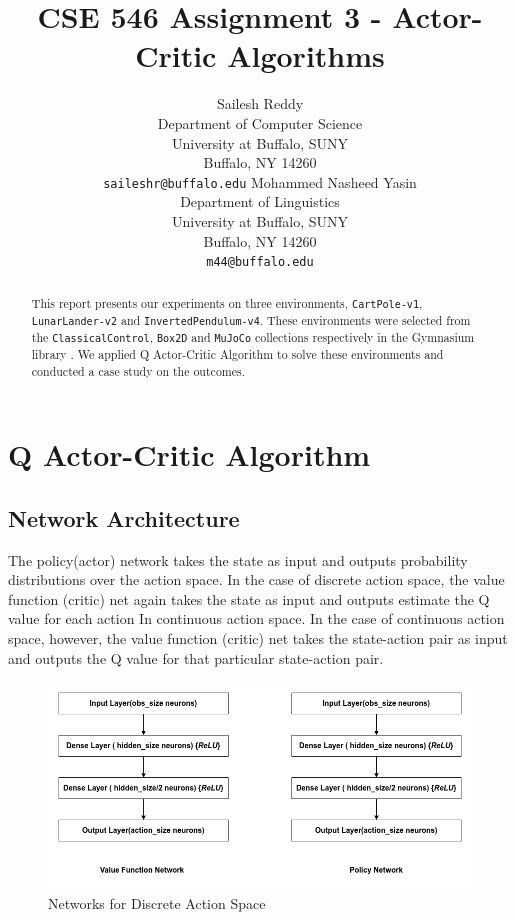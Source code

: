\documentclass{article} %
\title{CSE 546 Assignment 3 - Actor-Critic Algorithms}
\author{
   Sailesh Reddy \\
   Department of Computer Science\\
   University at Buffalo, SUNY\\
   Buffalo, NY 14260 \\
   \texttt{saileshr@buffalo.edu}
   \And
   Mohammed Nasheed Yasin \\
   Department of Linguistics\\
   University at Buffalo, SUNY\\
   Buffalo, NY 14260 \\
   \texttt{m44@buffalo.edu}
}
\begin{document}
\maketitle

\begin{abstract}
    This report presents our experiments on three environments, \verb|CartPole-v1|, \verb|LunarLander-v2| and \verb|InvertedPendulum-v4|. These environments were selected from the \verb|ClassicalControl|, \verb|Box2D| and \verb|MuJoCo| collections respectively in the Gymnasium library \cite{1606.01540}. We applied Q Actor-Critic Algorithm to solve these environments and conducted a case study on the outcomes.
\end{abstract}


\section{Q Actor-Critic Algorithm}

\subsection{Network Architecture}
The policy(actor) network takes the state as input and outputs probability distributions over the action space. In the case of discrete action space, the value function (critic) net again takes the state as input and outputs estimate the Q value for each action In continuous action space. In the case of continuous action space, however, the value function (critic) net takes the state-action pair as input and outputs the Q value for that particular state-action pair.

\begin{figure}[H]
    \begin{center}
        \includegraphics[width=\textwidth]{discrete.png}
    \end{center}
    \caption{Networks for Discrete Action Space}
\end{figure}
\end{document}
